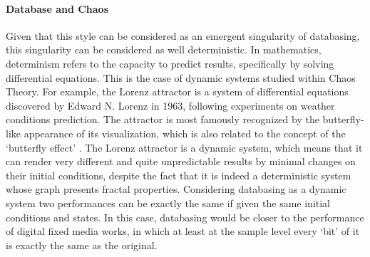\paragraph{Database and Chaos}
Given that this style can be considered as an emergent singularity of databasing, this singularity can be considered as well deterministic. In mathematics, determinism refers to the capacity to predict results, specifically by solving differential equations. This is the case of dynamic systems studied within Chaos Theory. For example, the Lorenz attractor is a system of differential equations discovered by Edward N. Lorenz in 1963, following experiments on weather conditions prediction. The attractor is most famously recognized by the butterfly-like appearance of its visualization, which is also related to the concept of the `butterfly effect' . The Lorenz attractor is a dynamic system, which means that it can render very different and quite unpredictable results by minimal changes on their initial conditions, despite the fact that it is indeed a deterministic system whose graph presents fractal properties. Considering databasing as a dynamic system two performances can be exactly the same if given the same initial conditions and states. In this case, databasing would be closer to the performance of digital fixed media works, in which at least at the sample level every `bit' of it is exactly the same as the original. 


